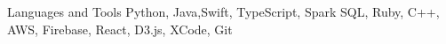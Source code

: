 

\begin{cvskills}

  \cvskill
  {Languages and Tools} %
  {Python, Java,Swift, TypeScript, Spark SQL, Ruby, C++, AWS, Firebase, React, D3.js, XCode, Git} %

\end{cvskills}